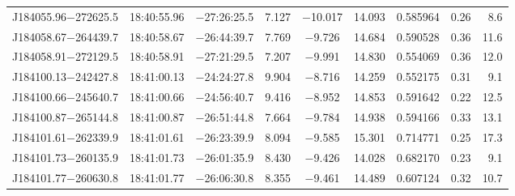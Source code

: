 \begin{table*}
\begin{tabular}{lcccccccr}
J184055.96$-$272625.5 & 18:40:55.96 & $-$27:26:25.5 &  7.127 & $-$10.017 & 14.093 & 0.585964 & 0.26 & 8.6 \\
J184058.67$-$264439.7 & 18:40:58.67 & $-$26:44:39.7 &  7.769 & $-$9.726 & 14.684 & 0.590528 & 0.36 & 11.6 \\
J184058.91$-$272129.5 & 18:40:58.91 & $-$27:21:29.5 &  7.207 & $-$9.991 & 14.830 & 0.554069 & 0.36 & 12.0 \\
J184100.13$-$242427.8 & 18:41:00.13 & $-$24:24:27.8 &  9.904 & $-$8.716 & 14.259 & 0.552175 & 0.31 & 9.1 \\
J184100.66$-$245640.7 & 18:41:00.66 & $-$24:56:40.7 &  9.416 & $-$8.952 & 14.853 & 0.591642 & 0.22 & 12.5 \\
J184100.87$-$265144.8 & 18:41:00.87 & $-$26:51:44.8 &  7.664 & $-$9.784 & 14.938 & 0.594166 & 0.33 & 13.1 \\
J184101.61$-$262339.9 & 18:41:01.61 & $-$26:23:39.9 &  8.094 & $-$9.585 & 15.301 & 0.714771 & 0.25 & 17.3 \\
J184101.73$-$260135.9 & 18:41:01.73 & $-$26:01:35.9 &  8.430 & $-$9.426 & 14.028 & 0.682170 & 0.23 & 9.1 \\
J184101.77$-$260630.8 & 18:41:01.77 & $-$26:06:30.8 &  8.355 & $-$9.461 & 14.489 & 0.607124 & 0.32 & 10.7 \\
\hline
\end{tabular}
\end{table*}

\addtocounter{table}{-1}

